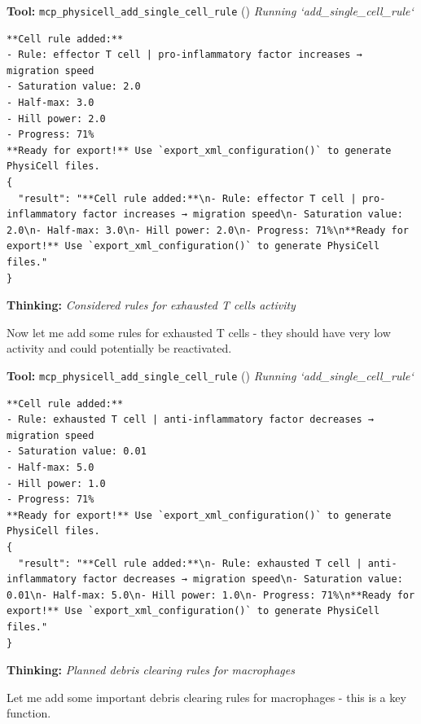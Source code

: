 \documentclass[11pt,a4paper]{article}
\begin{document}
\begin{toolokbox}
\textbf{Tool:} \texttt{mcp\_physicell\_add\_single\_cell\_rule} (\checkmark)
\textit{Running `add\_single\_cell\_rule`}
\begin{lstlisting}
**Cell rule added:**
- Rule: effector T cell | pro-inflammatory factor increases → migration speed
- Saturation value: 2.0
- Half-max: 3.0
- Hill power: 2.0
- Progress: 71%
**Ready for export!** Use `export_xml_configuration()` to generate PhysiCell files.
{
  "result": "**Cell rule added:**\n- Rule: effector T cell | pro-inflammatory factor increases → migration speed\n- Saturation value: 2.0\n- Half-max: 3.0\n- Hill power: 2.0\n- Progress: 71%\n**Ready for export!** Use `export_xml_configuration()` to generate PhysiCell files."
}
\end{lstlisting}
\end{toolokbox}
\begin{thinkbox}
\textbf{Thinking:} \textit{Considered rules for exhausted T cells activity}

Now let me add some rules for exhausted T cells - they should have very low activity and could potentially be reactivated.

\end{thinkbox}
\begin{toolokbox}
\textbf{Tool:} \texttt{mcp\_physicell\_add\_single\_cell\_rule} (\checkmark)
\textit{Running `add\_single\_cell\_rule`}
\begin{lstlisting}
**Cell rule added:**
- Rule: exhausted T cell | anti-inflammatory factor decreases → migration speed
- Saturation value: 0.01
- Half-max: 5.0
- Hill power: 1.0
- Progress: 71%
**Ready for export!** Use `export_xml_configuration()` to generate PhysiCell files.
{
  "result": "**Cell rule added:**\n- Rule: exhausted T cell | anti-inflammatory factor decreases → migration speed\n- Saturation value: 0.01\n- Half-max: 5.0\n- Hill power: 1.0\n- Progress: 71%\n**Ready for export!** Use `export_xml_configuration()` to generate PhysiCell files."
}
\end{lstlisting}
\end{toolokbox}
\begin{thinkbox}
\textbf{Thinking:} \textit{Planned debris clearing rules for macrophages}

Let me add some important debris clearing rules for macrophages - this is a key function.

\end{thinkbox}
\end{document}
